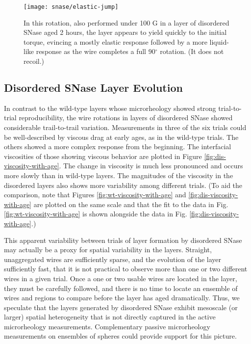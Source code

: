\begin{figure}
    \centering
    \texttt{[image: snase/elastic-jump]} %
    \caption{\label{fig:deviation-elastic-jump}In this rotation, also performed under 100 G in a layer of disordered SNase aged 2 hours, the layer appears to yield quickly to the initial torque, evincing a mostly elastic response followed by a more liquid-like response as the wire completes a full 90$^\circ$ rotation. (It does not recoil.)}
    \end{figure}
   

\subsection{Disordered SNase Layer Evolution}

In contrast to the wild-type layers whose microrheology showed strong trial-to-trial reproducibility, the wire rotations in layers of disordered SNase showed considerable trail-to-trail variation. Measurements in three of the six trials could be well-described by viscous drag at early ages, as in the wild-type trials. The others showed a more complex response from the beginning. The interfacial viscosities of those showing viscous behavior are plotted in Figure \ref{fig:dis-viscosity-with-age}. The change in viscosity is much less pronounced and occurs more slowly than in wild-type layers. The magnitudes of the viscosity in the disordered layers also shows more variability among different trials. (To aid the comparison, note that Figures \ref{fig:wt-viscosity-with-age} and \ref{fig:dis-viscosity-with-age} are plotted on the same scale and that the fit to the data in Fig. \ref{fig:wt-viscosity-with-age} is shown alongside the data in Fig. \ref{fig:dis-viscosity-with-age}.)

This apparent variability between trials of layer formation by disordered SNase may actually be a proxy for spatial variability in the layers. Straight, unaggregated wires are sufficiently sparse, and the evolution of the layer sufficiently fast, that it is not practical to observe more than one or two different wires in a given trial. Once a one or two usable wires are located in the layer, they must be carefully followed, and there is no time to locate an ensemble of wires and regions to compare before the layer has aged dramatically. Thus, we speculate that the layers generated by disordered SNase exhibit mesoscale (or larger) spatial heterogeneity that is not directly captured in the active microrheology measurements. Complementary passive microrheology measurements on ensembles of spheres could provide support for this picture.

